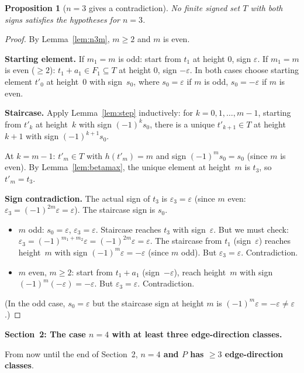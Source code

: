 \documentclass{article}
\newtheorem{prop}{Proposition}
\begin{document}
\begin{prop}[$n=3$ gives a contradiction]\label{prop:n3}
No finite signed set $T$ with both signs satisfies the hypotheses for $n=3$.
\end{prop}
\begin{proof}
By Lemma~\ref{lem:n3m}, $m\ge 2$ and $m$ is even.

\textbf{Starting element.}
If $m_1=m$ is odd: start from $t_1$ at height $0$, sign $\varepsilon$.
If $m_1=m$ is even ($\ge 2$): $t_1+a_1\in F_1\subseteq T$ at height $0$, sign $-\varepsilon$.
In both cases choose starting element $t'_0$ at height~$0$ with sign~$s_0$, where
$s_0=\varepsilon$ if $m$ is odd, $s_0=-\varepsilon$ if $m$ is even.

\textbf{Staircase.}
Apply Lemma~\ref{lem:step} inductively: for $k=0,1,\dots,m-1$,
starting from $t'_k$ at height~$k$ with sign $(-1)^k s_0$,
there is a unique $t'_{k+1}\in T$ at height $k+1$ with sign $(-1)^{k+1}s_0$.

At $k=m-1$: $t'_m\in T$ with $h(t'_m)=m$ and sign $(-1)^m s_0=s_0$
(since $m$ is even).
By Lemma~\ref{lem:betamax}, the unique element at height~$m$ is $t_3$, so $t'_m=t_3$.

\textbf{Sign contradiction.}
The actual sign of $t_3$ is $\varepsilon_3=\varepsilon$ (since $m$ even: $\varepsilon_3=(-1)^{2m}\varepsilon=\varepsilon$).
The staircase sign is $s_0$.
\begin{itemize}
  \item $m$ odd: $s_0=\varepsilon$, $\varepsilon_3=\varepsilon$.  Staircase reaches $t_3$ with sign~$\varepsilon$.
       But we must check: $\varepsilon_3=(-1)^{m_1+m_2}\varepsilon=(-1)^{2m}\varepsilon=\varepsilon$.
       The staircase from $t_1$ (sign~$\varepsilon$) reaches height~$m$ with sign $(-1)^m\varepsilon=-\varepsilon$
       (since $m$ odd).  But $\varepsilon_3=\varepsilon$.  Contradiction.
  \item $m$ even, $m\ge 2$: start from $t_1+a_1$ (sign~$-\varepsilon$), reach height~$m$ with
       sign $(-1)^m(-\varepsilon)=-\varepsilon$.  But $\varepsilon_3=\varepsilon$.  Contradiction.
\end{itemize}
(In the odd case, $s_0=\varepsilon$ but the staircase sign at height $m$ is $(-1)^m\varepsilon=-\varepsilon\ne\varepsilon$.)
\end{proof}

\bigskip
\noindent\textbf{Section~2: The case $n=4$ with at least three edge-direction classes.}

From now until the end of Section~2, \textbf{$n=4$ and $P$ has $\ge 3$ edge-direction classes}.
\end{document}

